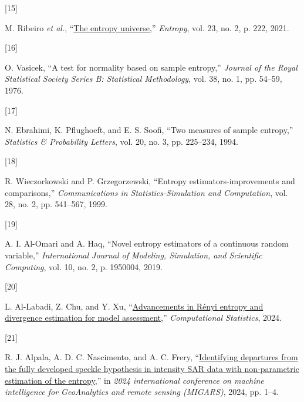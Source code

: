 \documentclass[
  journal,
]{IEEEtran}%
\newlength{\cslhangindent}
\newlength{\csllabelwidth}
\newenvironment{CSLReferences}[2] %
 {\begin{list}{}{%
  \setlength{\itemindent}{0pt}
  \setlength{\leftmargin}{0pt}
  \setlength{\parsep}{0pt}
  \ifodd #1
   \setlength{\leftmargin}{\cslhangindent}
   \setlength{\itemindent}{-1\cslhangindent}
  \fi
  \setlength{\itemsep}{#2\baselineskip}}}
 {\end{list}}
\newcommand{\CSLLeftMargin}[1]{\parbox[t]{\csllabelwidth}{\strut#1\strut}}
\newcommand{\CSLRightInline}[1]{\parbox[t]{\linewidth - \csllabelwidth}{\strut#1\strut}}
\providecommand{\bibfont}{\footnotesize}
\begin{document}
\begin{CSLReferences}{0}{0}
\CSLLeftMargin{{[}15{]} }%
\CSLRightInline{M. Ribeiro \emph{et al.},
{``\href{https://doi.org/10.3390/e23020222}{The entropy universe},''}
\emph{Entropy}, vol. 23, no. 2, p. 222, 2021. }

\CSLLeftMargin{{[}16{]} }%
\CSLRightInline{O. Vasicek, {``A test for normality based on sample
entropy,''} \emph{Journal of the Royal Statistical Society Series B:
Statistical Methodology}, vol. 38, no. 1, pp. 54--59, 1976. }

\CSLLeftMargin{{[}17{]} }%
\CSLRightInline{N. Ebrahimi, K. Pflughoeft, and E. S. Soofi, {``Two
measures of sample entropy,''} \emph{Statistics \& Probability Letters},
vol. 20, no. 3, pp. 225--234, 1994. }

\CSLLeftMargin{{[}18{]} }%
\CSLRightInline{R. Wieczorkowski and P. Grzegorzewski, {``Entropy
estimators-improvements and comparisons,''} \emph{Communications in
Statistics-Simulation and Computation}, vol. 28, no. 2, pp. 541--567,
1999. }

\CSLLeftMargin{{[}19{]} }%
\CSLRightInline{A. I. Al-Omari and A. Haq, {``Novel entropy estimators
of a continuous random variable,''} \emph{International Journal of
Modeling, Simulation, and Scientific Computing}, vol. 10, no. 2, p.
1950004, 2019. }

\CSLLeftMargin{{[}20{]} }%
\CSLRightInline{L. Al-Labadi, Z. Chu, and Y. Xu,
{``\href{https://doi.org/10.1007/s00180-024-01507-z}{Advancements in
{R}ényi entropy and divergence estimation for model assessment},''}
\emph{Computational Statistics}, 2024. }

\CSLLeftMargin{{[}21{]} }%
\CSLRightInline{R. J. Alpala, A. D. C. Nascimento, and A. C. Frery,
{``\href{https://doi.org/10.1109/migars61408.2024.10544448}{Identifying
departures from the fully developed speckle hypothesis in intensity SAR
data with non-parametric estimation of the entropy},''} in \emph{2024
international conference on machine intelligence for GeoAnalytics and
remote sensing (MIGARS)}, 2024, pp. 1--4. }

\end{CSLReferences}


\ifCLASSOPTIONcaptionsoff
  \newpage
\fi



\pagebreak[3]
\end{document}
